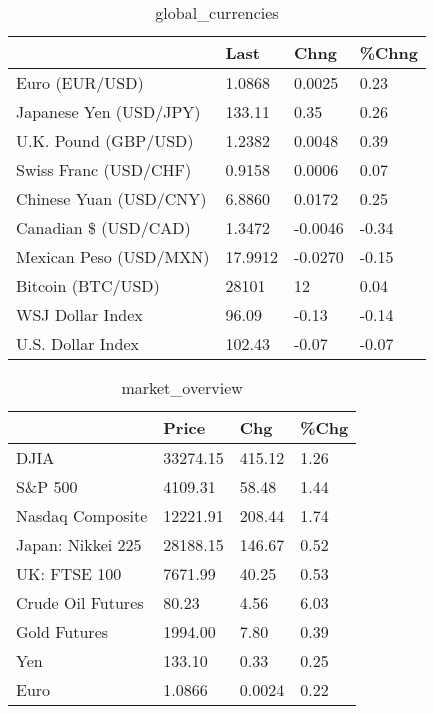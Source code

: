 \documentclass{article}%
\begin{document}
%


\begin{table}[htbp]%
\caption{global\_currencies}%
\centering%
\begin{adjustbox}{width=1\textwidth}%
\begin{tabular}{llll}
\toprule
                       &    Last &    Chng & \%Chng \\
\midrule
        Euro (EUR/USD) &  1.0868 &  0.0025 &  0.23 \\
Japanese Yen (USD/JPY) &  133.11 &    0.35 &  0.26 \\
  U.K. Pound (GBP/USD) &  1.2382 &  0.0048 &  0.39 \\
 Swiss Franc (USD/CHF) &  0.9158 &  0.0006 &  0.07 \\
Chinese Yuan (USD/CNY) &  6.8860 &  0.0172 &  0.25 \\
  Canadian \$ (USD/CAD) &  1.3472 & -0.0046 & -0.34 \\
Mexican Peso (USD/MXN) & 17.9912 & -0.0270 & -0.15 \\
     Bitcoin (BTC/USD) &   28101 &      12 &  0.04 \\
      WSJ Dollar Index &   96.09 &   -0.13 & -0.14 \\
     U.S. Dollar Index &  102.43 &   -0.07 & -0.07 \\
\bottomrule
\end{tabular}
%
\end{adjustbox}%
\end{table}

%


\begin{table}[htbp]%
\caption{market\_overview}%
\centering%
\begin{adjustbox}{width=1\textwidth}%
\begin{tabular}{llll}
\toprule
                  &    Price &    Chg & \%Chg \\
\midrule
             DJIA & 33274.15 & 415.12 & 1.26 \\
          S\&P 500 &  4109.31 &  58.48 & 1.44 \\
 Nasdaq Composite & 12221.91 & 208.44 & 1.74 \\
Japan: Nikkei 225 & 28188.15 & 146.67 & 0.52 \\
     UK: FTSE 100 &  7671.99 &  40.25 & 0.53 \\
Crude Oil Futures &    80.23 &   4.56 & 6.03 \\
     Gold Futures &  1994.00 &   7.80 & 0.39 \\
              Yen &   133.10 &   0.33 & 0.25 \\
             Euro &   1.0866 & 0.0024 & 0.22 \\
\bottomrule
\end{tabular}
%
\end{adjustbox}%
\end{table}

%
\end{document}
